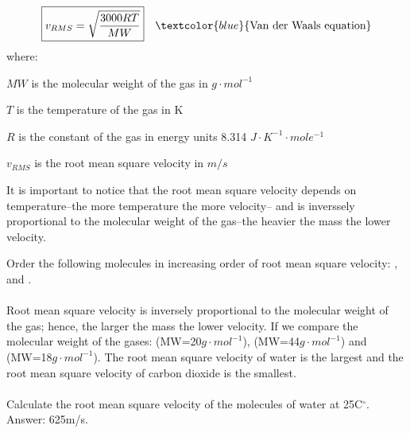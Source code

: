 \documentclass[main.tex]{subfiles}
\begin{document}
\begin{description}
\begin{equation*}\begin{split}
\boxed{  v_{RMS}=\sqrt{   \frac{3000RT}{MW} }   } \quad \textcolor{blue}{\text{Van der Waals equation}}
\end{split}\end{equation*}
where:
\begin{where}
 \item $MW$   is the molecular weight of the gas in $g\cdot mol^{-1}$
\item $T$   is the temperature of the gas in K
\item $R$   is the constant of the gas in energy units 8.314 $J\cdot K^{-1}\cdot mole^{-1} $
\item $v_{RMS}$ is the root mean square velocity in $m/s$
\end{where}
It is important to notice that the root mean square velocity depends on temperature--the more temperature the more velocity-- and is inverssely proportional to the molecular weight of the gas--the heavier the mass the lower velocity.


\begin{example} %
Order the following molecules in increasing order of root mean square velocity: ,  and .\\
\\
Root mean square velocity is inversely proportional to the molecular weight of the gas; hence, the larger the mass the lower velocity. If we compare the molecular weight of the gases: (MW=20$g\cdot mol^{-1}$), (MW=44$g\cdot mol^{-1}$) and (MW=18$g\cdot mol^{-1}$). The root mean square velocity of water is the largest and the root mean square velocity of carbon dioxide is the smallest.
\\
\faDiamond\ \\
Calculate the root mean square velocity of the molecules of water at 25C$^{\circ}$.\\
\flushright Answer: 625m/s.
\end{example}%

\end{description}
\end{document}
